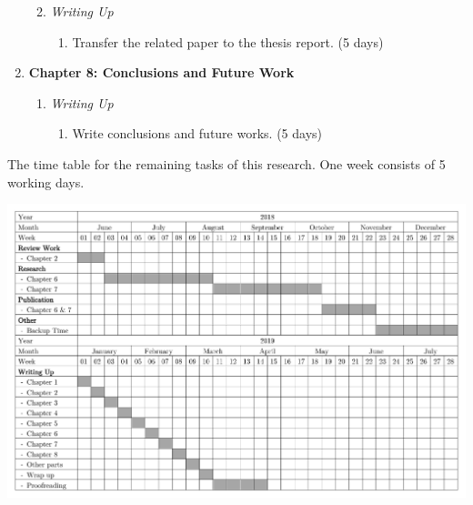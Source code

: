 \documentclass[12pt, a4paper]{report} \usepackage[titletoc]{appendix}
\begin{document}
\begin{enumerate}
\begin{enumerate}
\begin{enumerate}
        \end{enumerate}
        \item \textit{Writing Up}
        \begin{enumerate}
            \item Transfer the related paper to the thesis report. (5 days)
        \end{enumerate}
    \end{enumerate}
    \item \textbf{Chapter 8: Conclusions and Future Work}
    \begin{enumerate}
        \item \textit{Writing Up}
        \begin{enumerate}
            \item Write conclusions and future works. (5 days)
        \end{enumerate}
    \end{enumerate}
\end{enumerate}

\begin{landscape}

\begin{table}[h]
\centering
\caption{The time table for the remaining tasks of this research. One week consists of 5 working days. }
\label{table:timetable}
\centering
\includegraphics[width=0.95\linewidth]{images/timetable}
\label{fig:timetable}
\end{table}
\end{landscape}
\end{document}
